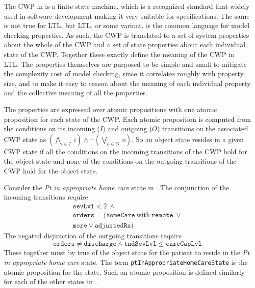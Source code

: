 The CWP in  is a finite state machine, which is a recognized standard that widely used in software development making it very suitable for specifications. The same is not true for LTL, but LTL, or some variant, is the common language for model checking properties. As such, the CWP is translated to a set of system properties about the whole of the CWP and a set of state properties about each individual state of the CWP. Together these exactly define the meaning of the CWP in LTL. The properties themselves are purposed to be simple and small to mitigate the complexity cost of model checking, since it correlates roughly with property size, and to make it easy to reason about the meaning of each individual property and the collective meaning of all the properties. 

The properties are expressed over atomic propositions with one atomic proposition for each state of the CWP. Each atomic proposition is computed from the conditions on its incoming ($I$) and outgoing ($O$) transitions on the associated CWP state as $(\bigwedge_{i \in I}\ i) \wedge \neg(\bigvee_{o \in O}\ o)$. So an object state resides in a given CWP state if all the conditions on the incoming transitions of the CWP hold for the object state and none of the conditions on the outgoing transitions of the CWP hold for the object state.

Consider the \emph{Pt in appropriate home care} state in . The conjunction of the incoming transitions require
%
\[
\begin{array}{l}
  \mathtt{sevLvl} < 2\ \wedge\ \\
  \mathtt{orders} = (\mathtt{homeCare}\ \mathrm{with}\ \mathtt{remote}\ \vee \\
                    \mathtt{more} \vee \mathtt{adjustedRx})
\end{array}
\]
%
The negated disjunction of the outgoing transitions require
%
\[
  \mathtt{orders} \neq \mathtt{discharge} \wedge \mathtt{tndSevLvl} \le \mathtt{careCapLvl}
\]
%
\noindent These together must by true of the object state for the patient to reside in the \emph{Pt in appropriate home care} state. The term \texttt{ptInAppropriateHomeCareState} is the atomic proposition for the state. Such an atomic proposition is defined similarly for each of the other states in .

